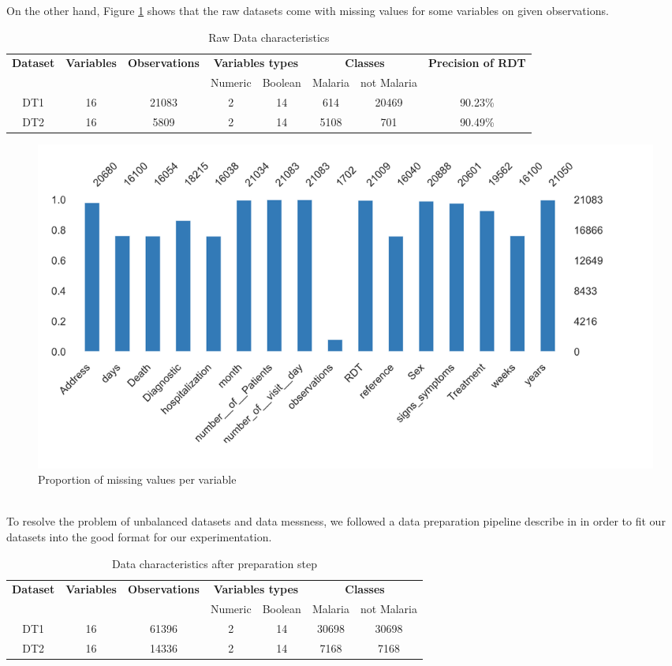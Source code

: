 On the other hand,  Figure \ref{missing_values} shows that the raw datasets come with missing values for  some variables on given observations.
\begin{table}[!ht]
\centering
  \begin{tabular}{cccccccc}
    \toprule
    \multirow{2}{*}{\textbf{Dataset}} &
      \textbf{Variables}&\textbf{Observations}&
      \multicolumn{2}{c}{\textbf{Variables types}}& \multicolumn{2}{c}{\textbf{Classes}} & \textbf{Precision of RDT}\\
    & & & Numeric & Boolean & Malaria & not Malaria \\
    \midrule
    DT1 &16 & 21083  & 2 &  14& 614&20469 & 90.23\% \\
    DT2 & 16 & 5809 & 2 & 14 & 5108&701 & 90.49\% \\
    \bottomrule
  \end{tabular}
  \caption{Raw Data characteristics}\label{raw_data}
\end{table}
\begin{figure}[!ht]
    \centering
    \includegraphics[width=.8\linewidth]{missing_values}
    \caption{Proportion of missing values per variable}
    \label{missing_values}
\end{figure}
\\
To resolve the problem of unbalanced datasets and data messness, we followed a data preparation pipeline describe in \cite{mbaye2019towards} in order to fit our datasets into the good format for our experimentation.
\begin{table}[!ht]
\centering
\scriptsize
  \begin{tabular}{ccccccc}
    \toprule
    \multirow{2}{*}{\textbf{Dataset}} &
      \textbf{Variables}&\textbf{Observations}&
      \multicolumn{2}{c}{\textbf{Variables types}}& \multicolumn{2}{c}{\textbf{Classes}} \\
    & & & Numeric & Boolean & Malaria & not Malaria \\
    \midrule
    DT1 &16 & 61396 & 2 &  14& 30698&30698\\
    DT2 & 16 & 14336 & 2 & 14 & 7168&7168\\
    \bottomrule
  \end{tabular}
  \caption{Data characteristics after preparation step}\label{synthetic_data}
\end{table}

